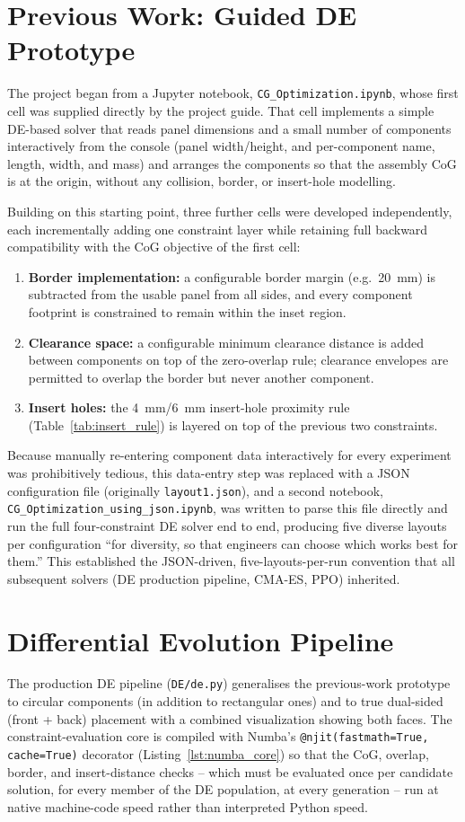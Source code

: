 \documentclass[11pt,a4paper,oneside]{report}
\begin{document}
\section{Previous Work: Guided DE Prototype}
\label{sec:previous_work}
The project began from a Jupyter notebook, \texttt{CG\_Optimization.ipynb}, whose first cell was supplied directly by the project guide. That cell implements a simple DE-based solver that reads panel dimensions and a small number of components interactively from the console (panel width/height, and per-component name, length, width, and mass) and arranges the components so that the assembly CoG is at the origin, without any collision, border, or insert-hole modelling.


Building on this starting point, three further cells were developed independently, each incrementally adding one constraint layer while retaining full backward compatibility with the CoG objective of the first cell:
\begin{enumerate}
    \item \textbf{Border implementation:} a configurable border margin (e.g.\ 20~mm) is subtracted from the usable panel  from all sides, and every component footprint is constrained to remain within the inset region.
    \item \textbf{Clearance space:} a configurable minimum clearance distance is added between components on top of the zero-overlap rule; clearance envelopes are permitted to overlap the border but never another component.
    \item \textbf{Insert holes:} the 4~mm/6~mm insert-hole proximity rule (Table~\ref{tab:insert_rule}) is layered on top of the previous two constraints.
\end{enumerate}
Because manually re-entering component data interactively for every experiment was prohibitively tedious, this data-entry step was replaced with a JSON configuration file (originally \texttt{layout1.json}), and a second notebook, \texttt{CG\_Optimization\_using\_json.ipynb}, was written to parse this file directly and run the full four-constraint DE solver end to end, producing five diverse layouts per configuration ``for diversity, so that engineers can choose which works best for them.'' This established the JSON-driven, five-layouts-per-run convention that all subsequent solvers (DE production pipeline, CMA-ES, PPO) inherited.

\section{Differential Evolution Pipeline}
\label{sec:de_pipeline}
The production DE pipeline (\texttt{DE/de.py}) generalises the previous-work prototype to circular components (in addition to rectangular ones) and to true dual-sided (front + back) placement with a combined visualization showing both faces. The constraint-evaluation core is compiled with Numba's \texttt{@njit(fastmath=True, cache=True)} decorator (Listing~\ref{lst:numba_core}) so that the CoG, overlap, border, and insert-distance checks -- which must be evaluated once per candidate solution, for every member of the DE population, at every generation -- run at native machine-code speed rather than interpreted Python speed.
\end{document}
